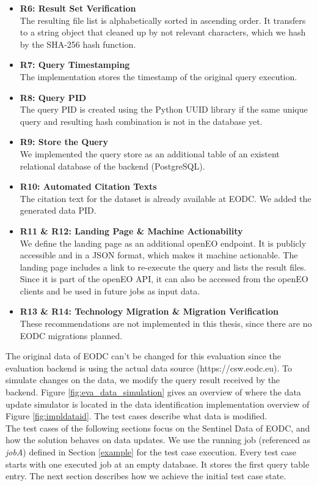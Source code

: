 \documentclass[draft,final]{vutinfth} %
\begin{document}
\begin{itemize}
	\item \textbf{R6: Result Set Verification} \\
	The resulting file list is alphabetically sorted in ascending order. It transfers to a string object that cleaned up by not relevant characters, which we hash by the SHA-256 hash function. 
	\item \textbf{R7: Query Timestamping} \\
	The implementation stores the timestamp of the original query execution. 
	\item \textbf{R8: Query PID}\\
	The query PID is created using the Python UUID library if the same unique query and resulting hash combination is not in the database yet.
	\item \textbf{R9: Store the Query} \\
	We implemented the query store as an additional table of an existent relational database of the backend (PostgreSQL). 
	\item \textbf{R10: Automated Citation Texts} \\
	The citation text for the dataset is already available at EODC. We added the generated data PID. 
	\item \textbf{R11 \& R12: Landing Page \& Machine Actionability} \\
	We define the landing page as an additional openEO endpoint. It is publicly accessible and in a JSON format, which makes it machine actionable. The landing page includes a link to re-execute the query and lists the result files. Since it is part of the openEO API, it can also be accessed from the openEO clients and be used in future jobs as input data.
	\item \textbf{R13 \& R14: Technology Migration \& Migration Verification} \\
	These recommendations are not implemented in this thesis, since there are no EODC migrations planned.
\end{itemize}

The original data of EODC can't be changed for this evaluation since the evaluation backend is using the actual data source (https://csw.eodc.eu). To simulate changes on the data, we modify the query result received by the backend. Figure \ref{fig:eva_data_simulation} gives an overview of where the data update simulator is located in the data identification implementation overview of Figure \ref{fig:impldataid}. The test cases describe what data is modified. \\
The test cases of the following sections focus on the Sentinel Data of EODC, and how the solution behaves on data updates. We use the running job (referenced as \textit{jobA}) defined in Section \ref{example} for the test case execution. Every test case starts with one executed job at an empty database. It stores the first query table entry. The next section describes how we achieve the initial test case state.
\end{document}
